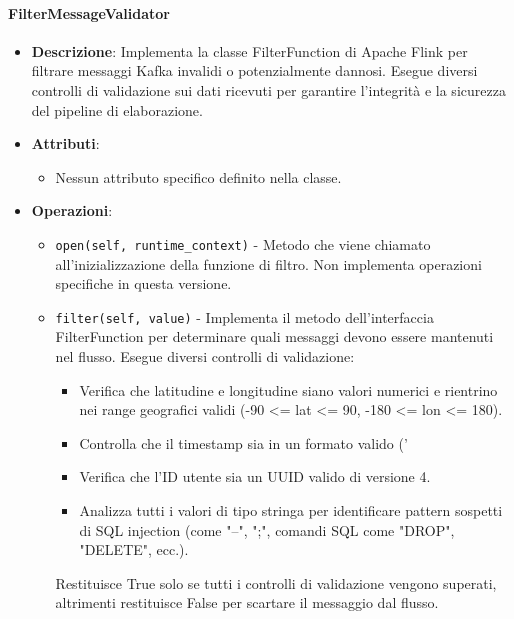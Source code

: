 \documentclass[10pt]{article}
\begin{document}
    \paragraph{FilterMessageValidator}
    \begin{itemize} 
    \item \textbf{Descrizione}: Implementa la classe FilterFunction di Apache Flink per filtrare messaggi Kafka invalidi o potenzialmente dannosi. Esegue diversi controlli di validazione sui dati ricevuti per garantire l'integrità e la sicurezza del pipeline di elaborazione.
    \item \textbf{Attributi}:
    \begin{itemize}
        \item Nessun attributo specifico definito nella classe.
    \end{itemize}
    
    \item \textbf{Operazioni}:
    \begin{itemize}
        \item \texttt{open(self, runtime\_context)} - Metodo che viene chiamato all'inizializzazione della funzione di filtro. Non implementa operazioni specifiche in questa versione.
        
        \item \texttt{filter(self, value)} - Implementa il metodo dell'interfaccia FilterFunction per determinare quali messaggi devono essere mantenuti nel flusso. Esegue diversi controlli di validazione:
        \begin{itemize}
            \item Verifica che latitudine e longitudine siano valori numerici e rientrino nei range geografici validi (-90 <= lat <= 90, -180 <= lon <= 180).
            \item Controlla che il timestamp sia in un formato valido ('%
            \item Verifica che l'ID utente sia un UUID valido di versione 4.
            \item Analizza tutti i valori di tipo stringa per identificare pattern sospetti di SQL injection (come "--", ";", comandi SQL come "DROP", "DELETE", ecc.).
        \end{itemize}
        Restituisce True solo se tutti i controlli di validazione vengono superati, altrimenti restituisce False per scartare il messaggio dal flusso.
    \end{itemize}
    \end{itemize}
\end{document}
